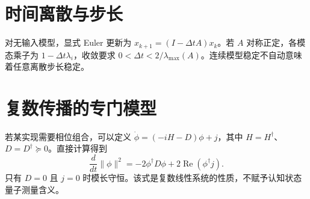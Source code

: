 \section{时间离散与步长}
对无输入模型，显式 Euler 更新为 $x_{k+1}=(I-\Delta t A)x_k$。若 $A$ 对称正定，各模态乘子为 $1-\Delta t\lambda_i$，收敛要求 $0<\Delta t<2/\lambda_{\max}(A)$。连续模型稳定不自动意味着任意离散步长稳定。
\section{复数传播的专门模型}
若某实现需要相位组合，可以定义 $\dot\phi=(-iH-D)\phi+j$，其中 $H=H^\dagger$、$D=D^\dagger\succeq0$。直接计算得到
\begin{equation}\frac{d}{dt}\|\phi\|^2=-2\phi^\dagger D\phi+2\operatorname{Re}(\phi^\dagger j).\end{equation}
只有 $D=0$ 且 $j=0$ 时模长守恒。该式是复数线性系统的性质，不赋予认知状态量子测量含义。

